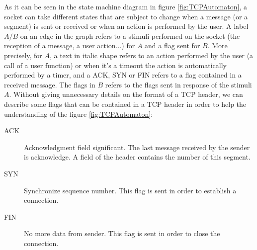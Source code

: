 \documentclass[a4paper, 10pt]{article}
\begin{document}
    As it can be seen in the state machine diagram in figure \ref{fig:TCPAutomaton},
    a socket can take different states that are
    subject to change when a message (or a segment) is sent or received or when an action
    is performed by the user. A label $A/B$ on an edge in the graph refers to a stimuli performed on the socket
    (the reception of a message, a user action...) for $A$ and a flag sent for $B$.
    More precisely, for $A$, a text in italic shape refers to an action performed by
    the user (a call of a user function) or when it's a timeout the action is automatically
    performed by a timer, and a ACK, SYN or FIN refers to a flag contained in a received message.
    The flags in $B$ refers to the flags sent in response of the stimuli $A$.
    Without giving unnecessary details on the format of a TCP header, we can
    describe some flags that can be contained in a TCP header in order to help the understanding
    of the figure \ref{fig:TCPAutomaton}:
    \begin{description}
        \item[ACK] Acknowledgment field significant. The last message received by the sender
        is acknowledge. A field of the header contains the number of this segment.
        \item[SYN] Synchronize sequence number. This flag is sent in order to establish
        a connection.
        \item[FIN] No more data from sender. This flag is sent in order to close the
        connection.
    \end{description}
    
\end{document}

